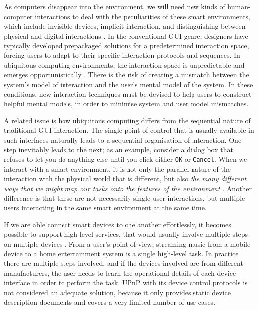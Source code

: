 As computers disappear into the environment, we will need new kinds of human-computer interactions to deal with the peculiarities of these smart environments, which include invisible devices, implicit interaction, and distinguishing between physical and digital interactions \cite{Ye2007}. In the conventional \ac{GUI} genre, designers have typically developed prepackaged solutions for a predetermined interaction space, forcing users to adapt to their specific interaction protocols and sequences. In ubiquitous computing environments, the interaction space is unpredictable and emerges opportunistically \cite{Coutaz2005a}. There is the risk of creating a mismatch between the system's model of interaction and the user's mental model of the system. In these conditions, new interaction techniques must be devised to help users to construct helpful mental models, in order to minimise system and user model mismatches.

A related issue is how ubiquitous computing differs from the sequential nature of traditional \ac{GUI} interaction. The single point of control that is usually available in such interfaces naturally leads to a sequential organisation of interaction. One step inevitably leads to the next; as an example, consider a dialog box that refuses to let you do anything else until you click either \texttt{OK} or \texttt{Cancel}. When we interact with a smart environment, it is not only the parallel nature of the interaction with the physical world that is different, but also \emph{the many different ways that we might map our tasks onto the features of the environment} \cite{Dourish2004}. Another difference is that these are not necessarily single-user interactions, but multiple users interacting in the same smart environment at the same time.

If we are able connect smart devices to one another effortlessly, it becomes possible to support high-level services, that would usually involve multiple steps on multiple devices \cite{Rich2009}. From a user's point of view, streaming music from a mobile device to a home entertainment system is a single high-level task. In practice there are multiple steps involved, and if the devices involved are from different manufacturers, the user needs to learn the operational details of each device interface in order to perform the task. \ac{UPnP} with its device control protocols \cite{uPnPDCP} is not considered an adequate solution, because it only provides static device description documents and covers a very limited number of use cases.

